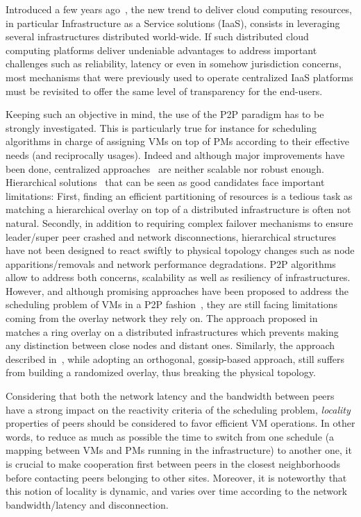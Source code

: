 Introduced a few years ago~\cite{greenberg:sigcomm09}, the new trend to deliver cloud
computing resources, in particular Infrastructure as a Service solutions (IaaS), consists
in leveraging several infrastructures distributed world-wide. If such distributed cloud
computing platforms deliver undeniable advantages to address important challenges such as
reliability, latency or even in somehow jurisdiction concerns, most mechanisms that were
previously used to operate centralized IaaS platforms must be revisited to offer the same
level of transparency for the end-users.

Keeping such an objective in mind, the use of the P2P paradigm has to be strongly
investigated. This is particularly true for instance for scheduling algorithms in charge
of assigning VMs on top of PMs according to their effective needs (and reciprocally
usages). Indeed and although major improvements have been done, centralized
approaches~\cite{hermenier:2013} are neither scalable nor robust enough. Hierarchical
solutions~\cite{feller:ccgrid12} that can be seen as good candidates face important
limitations: First, finding an efficient partitioning of resources is a tedious task as
matching a hierarchical overlay on top of a distributed infrastructure is often not
natural. Secondly, in addition to requiring complex failover mechanisms to ensure
leader/super peer crashed and network disconnections, hierarchical structures have not
been designed to react swiftly to physical topology changes such as node
apparitions/removals and network performance degradations. P2P algorithms allow to
address both concerns, \ie scalability as well as resiliency of infrastructures. However,
and although promising approaches have been proposed to address the scheduling problem of
VMs in a P2P fashion~\cite{quesnel:cpe2012,feller:cloudcom12}, they are still facing
limitations coming from the overlay network they rely on. The approach proposed
in~\cite{quesnel:cpe2012} matches a ring overlay on a distributed infrastructures which
prevents making any distinction between close nodes and distant ones. Similarly, the
approach described in~\cite{feller:cloudcom12}, while adopting an orthogonal, gossip-based approach,
still suffers from building a randomized overlay, thus breaking the physical topology.

Considering that both the network latency and the bandwidth between peers have a strong
impact on the reactivity criteria of the scheduling problem, \emph{locality} properties of
peers should be considered to favor efficient VM operations. In other words, to reduce as
much as possible the time to switch from one schedule (\ie a mapping between VMs and PMs
running in the infrastructure) to another one, it is crucial to make cooperation first
between peers in the closest neighborhoods before contacting peers belonging to other sites.
Moreover, it is noteworthy that this notion of locality is dynamic, and varies over time according
to the network bandwidth/latency and disconnection.

